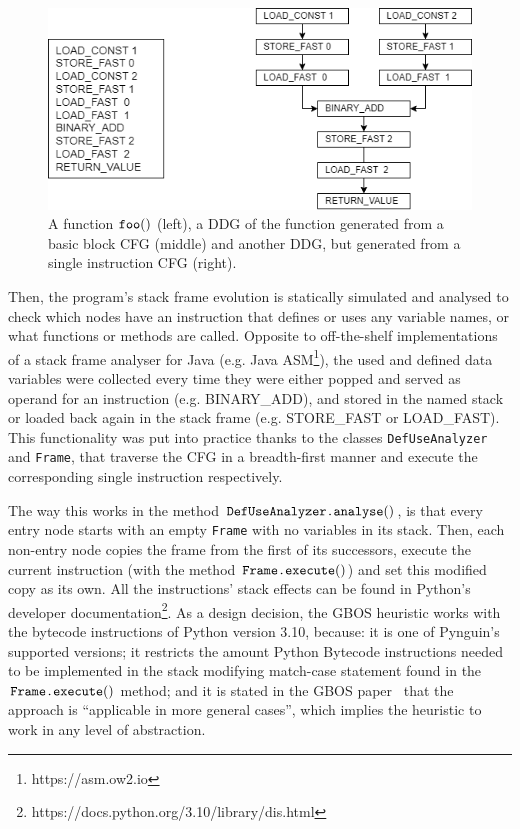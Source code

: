 \documentclass[%
  chapterprefix=false,%
  open=right,%
  twoside=true,%
  paper=a4,%
  logofile={Figures/logo.png},%
  thesistype=master,%
  UKenglish,%
]{se2thesis}
\newcommand{\classname}[1]{\texttt{#1}}
\newcommand{\callable}[2][]{\(\text{\texttt{#2}}(#1)\)}
\begin{document}
\begin{figure}[htb]
    \inputminted{python}{Figures/basic_block.py}
  \endminipage\hfill
    \includegraphics[width=\textwidth]{Figures/DDG.png}
  \endminipage\hfill
  \caption{A function \callable{foo} (left), a DDG of the function generated from a basic block CFG (middle) and another DDG, but generated from a single instruction CFG (right).}\label{fig:ddg_example}
\end{figure}


Then, the program's stack frame evolution is statically simulated and analysed to check which nodes have an instruction that defines or uses any variable names, or what functions or methods are called.
Opposite to off-the-shelf implementations of a stack frame analyser for Java (e.g. Java ASM\footnote{https://asm.ow2.io}), the used and defined data variables were collected every time they were either popped and served as operand for an instruction (e.g. BINARY\_ADD), and stored in the named stack or loaded back again in the stack frame (e.g. STORE\_FAST or LOAD\_FAST). 
This functionality was put into practice thanks to the classes \classname{DefUseAnalyzer} and \classname{Frame}, that traverse the CFG in a breadth-first manner and execute the corresponding single instruction respectively.

The way this works in the method \callable{DefUseAnalyzer.analyse}, is that every entry node starts with an empty \classname{Frame} with no variables in its stack.
Then, each non-entry node copies the frame from the first of its successors, execute the current instruction (with the method \callable{Frame.execute}) and set this modified copy as its own.
All the instructions' stack effects can be found in Python's developer documentation\footnote{https://docs.python.org/3.10/library/dis.html}.
As a design decision, the GBOS heuristic works with the bytecode instructions of Python version 3.10, because: it is one of Pynguin's supported versions; it restricts the amount Python Bytecode instructions needed to be implemented in the stack modifying match-case statement found in the \callable{Frame.execute} method; and it is stated in the GBOS paper~\cite{DBLP:conf/sigsoft/0001O00D21} that the approach is ``applicable in more general cases'', which implies the heuristic to work in any level of abstraction.
\end{document}
